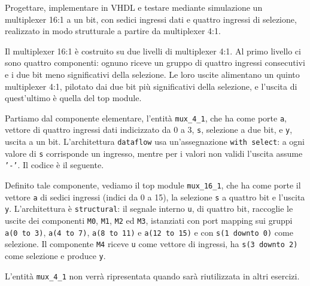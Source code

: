 \label{sec:esercizio1-1}

\begin{traccia}
Progettare, implementare in VHDL e testare mediante simulazione un multiplexer 16:1 a un bit, con sedici ingressi dati e quattro ingressi di selezione, realizzato in modo strutturale a partire da multiplexer 4:1.
\end{traccia}

\progetto

Il multiplexer 16:1 è costruito su due livelli di multiplexer 4:1. Al primo livello ci sono quattro componenti: ognuno riceve un gruppo di quattro ingressi consecutivi e i due bit meno significativi della selezione. Le loro uscite alimentano un quinto multiplexer 4:1, pilotato dai due bit più significativi della selezione, e l'uscita di quest'ultimo è quella del top module.


\implementazione

Partiamo dal componente elementare, l'entità \texttt{mux\_4\_1}, che ha come porte \texttt{a}, vettore di quattro ingressi dati indicizzato da 0 a 3, \texttt{s}, selezione a due bit, e \texttt{y}, uscita a un bit. L'architettura \texttt{dataflow} usa un'assegnazione \texttt{with select}: a ogni valore di \texttt{s} corrisponde un ingresso, mentre per i valori non validi l'uscita assume \texttt{'-'}. Il codice è il seguente.


Definito tale componente, vediamo il top module \texttt{mux\_16\_1}, che ha come porte il vettore \texttt{a} di sedici ingressi (indici da 0 a 15), la selezione \texttt{s} a quattro bit e l'uscita \texttt{y}. L'architettura è \texttt{structural}: il segnale interno \texttt{u}, di quattro bit, raccoglie le uscite dei componenti \texttt{M0}, \texttt{M1}, \texttt{M2} ed \texttt{M3}, istanziati con port mapping sui gruppi \texttt{a(0 to 3)}, \texttt{a(4 to 7)}, \texttt{a(8 to 11)} e \texttt{a(12 to 15)} e con \texttt{s(1 downto 0)} come selezione. Il componente \texttt{M4} riceve \texttt{u} come vettore di ingressi, ha \texttt{s(3 downto 2)} come selezione e produce \texttt{y}.


L'entità \texttt{mux\_4\_1} non verrà ripresentata quando sarà riutilizzata in altri esercizi.

